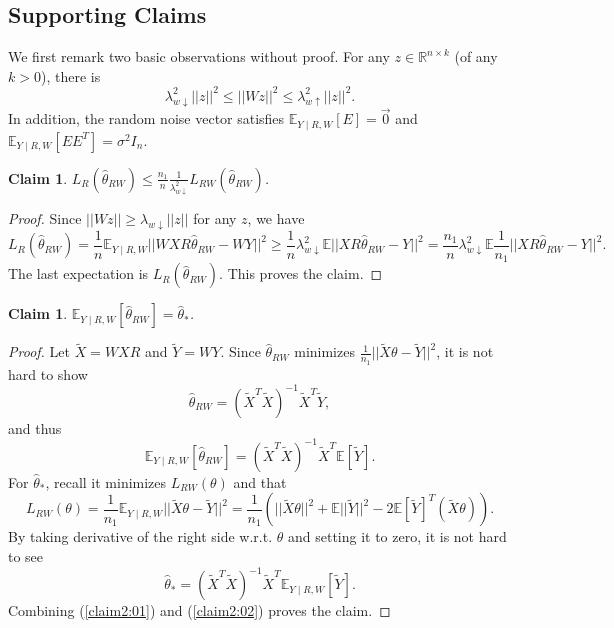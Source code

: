 \documentclass[a4paper,fleqn]{cas-sc}
\theoremstyle{plain}
\newtheorem{claim}[theorem]{Claim}
\newcommand{\R}{\mathbb{R}}
\newcommand{\E}{\mathbb{E}}
\newcommand{\tX}{\tilde{X}}
\newcommand{\tY}{\tilde{Y}}
\newcommand{\te}{\theta}
\newcommand{\hte}{\hat{\theta}}
\begin{document}
\subsection{Supporting Claims}
\vspace{5pt}

We first remark two basic 
observations without proof. 
For any $z \in \R^{n \times k}$ 
(of any $k > 0$), there is 
\begin{equation}
\lambda^2_{w \downarrow} 
||z||^2 \leq ||W z||^2 \leq 
\lambda^2_{w \uparrow} 
||z||^2.    
\end{equation}
In addition, 
the random noise vector 
satisfies $\E_{Y \mid R, W} [E] 
= \vec{0}$ and $\E_{Y \mid R, W} 
[EE^T] = \sigma^2 I_{n}$. 




\begin{claim}
\label{claim:01}
$L_R(\hte_{RW}) \leq \frac{n_1}{n} 
\frac{1}{\lambda_{w \downarrow}^{2}} 
L_{RW}(\hte_{RW})$. 
\end{claim}
\begin{proof}
Since $||W z|| \geq 
\lambda_{w \downarrow} 
||z||$ for any $z$, we have 
\begin{equation}
L_R(\hte_{RW}) = \frac{1}{n}
\E_{Y \mid R, W}||WXR \hte_{RW} - W Y||^2 
\geq \frac{1}{n} \lambda_{w \downarrow}^2  
\E ||XR \hte_{RW} - Y ||^2 
= \frac{n_1}{n} \lambda_{w \downarrow}^2  
\E \frac{1}{n_1} 
||XR \hte_{RW} - Y ||^2. 
\end{equation}
The last expectation is 
$L_R(\hte_{RW})$. This proves the claim.
\end{proof}

\begin{claim}
\label{claim:02}
$\E_{Y \mid R,W} 
[\hte_{RW}] = \hte_*$. 
\end{claim}
\begin{proof}
Let $\tX = WXR$ and $\tY = WY$. 
Since $\hte_{RW}$ minimizes 
$\frac{1}{n_1}||\tX \te - \tY||^2$, 
it is not hard to show 
\begin{equation}
\label{eq:claim02_03}
\hte_{RW} = (\tX^T \tX)^{-1} \tX^T \tY,   
\end{equation}
and thus 
\begin{equation}
\label{claim2:01}
\E_{Y \mid R, W} [\hte_{RW}] 
= (\tX^T \tX)^{-1} \tX^T \E[\tY].
\end{equation}
For $\hte_*$, recall it minimizes 
$L_{RW}(\te)$ and that 
\begin{equation}
L_{RW}(\te) 
= \frac{1}{n_1} 
\E_{Y \mid R, W} 
||\tX \te - \tY||^2
= \frac{1}{n_1} 
\left( ||\tX \te||^2 + 
\E ||\tY||^2 - 2 \E[\tY]^T(\tX \te)\right).
\end{equation}
By taking derivative of the right 
side w.r.t. $\te$ and setting it 
to zero, it is not hard to see 
\begin{equation}
\label{claim2:02}
\hte_* = (\tX^T \tX)^{-1} 
\tX^T \E_{Y \mid R, W} [\tY].  
\end{equation}
Combining (\ref{claim2:01}) 
and (\ref{claim2:02}) proves the claim. 
\end{proof}
\end{document}
